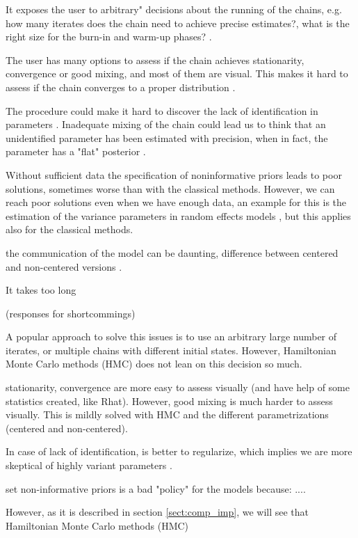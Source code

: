 \begin{enumerate}	
	\item It exposes the user to arbitrary" decisions about the running of the chains, e.g. how many iterates does the chain need to achieve precise estimates?, what is the right size for the burn-in and warm-up phases? \cite{Skrondal_et_al_2004a}. 
	
	\item The user has many options to assess if the chain achieves stationarity, convergence or good mixing, and most of them are visual. This makes it hard to assess if the chain converges to a proper distribution \cite{Gelman_et_al_1996}.
	
	\item The procedure could make it hard to discover the lack of identification in parameters \cite{Skrondal_et_al_2004a}. Inadequate mixing of the chain could lead us to think that an unidentified parameter has been estimated with precision, when in fact, the parameter has a "flat" posterior \cite{Keane_1992}.

{\color{red}
	\item Without sufficient data the specification of noninformative priors leads to poor solutions, sometimes worse than with the classical methods. However, we can reach poor solutions even when we have enough data, an example for this is the estimation of the variance parameters in random effects models \cite{Skrondal_et_al_2004a}, but this applies also for the classical methods.
	
	\item the communication of the model can be daunting, difference between centered and non-centered versions \cite{McElreath_2020}.
	
	\item It takes too long 
}		
\end{enumerate}

{\color{red} 
(responses for shortcommings)

A popular approach to solve this issues is to use an arbitrary large number of iterates, or multiple chains with different initial states. However, Hamiltonian Monte Carlo methods (HMC) does not lean on this decision so much.

stationarity, convergence are more easy to assess visually (and have help of some statistics created, like Rhat). However, good mixing is much harder to assess visually. This is mildly solved with HMC and the different parametrizations (centered and non-centered).

In case of lack of identification, is better to regularize, which implies we are more skeptical of highly variant parameters \cite{McElreath_2020}.

set non-informative priors is a bad "policy" for the models because: .... \cite{McElreath_2020}

However, as it is described in section \ref{sect:comp_imp}, we will see that Hamiltonian Monte Carlo methods (HMC)

}
